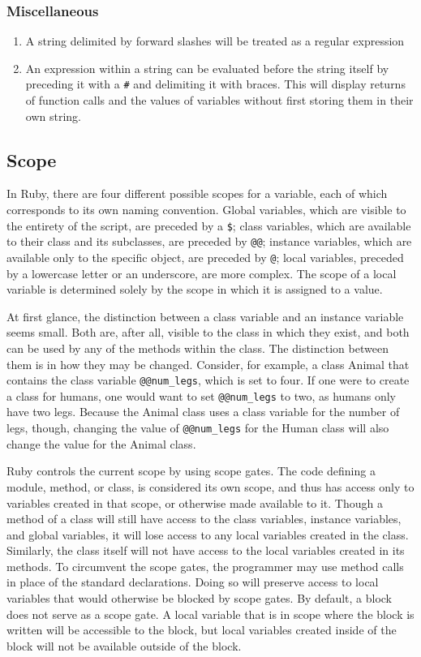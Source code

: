 \documentclass[12pt]{article}
\begin{document}
\subsubsection{Miscellaneous}
\begin{enumerate}
    \item{A string delimited by forward slashes will be treated as a regular expression}
    \item{An expression within a string can be evaluated before the string itself by preceding it with a \verb|#| and delimiting it with braces. This will display returns of function calls and the values of variables without first storing them in their own string.}
\end{enumerate}


\subsection{Scope}
In Ruby, there are four different possible scopes for a variable, each of which corresponds to its own naming convention. Global variables, which are visible to the entirety of the script, are preceded by a \verb|$|; class variables, which are available to their class and its subclasses, are preceded by \verb|@@|; instance variables, which are available only to the specific object, are preceded by \verb|@|; local variables, preceded by a lowercase letter or an underscore, are more complex. The scope of a local variable is determined solely by the scope in which it is assigned to a value\cite{darko}.

At first glance, the distinction between a class variable and an instance variable seems small. Both are, after all, visible to the class in which they exist, and both can be used by any of the methods within the class. The distinction between them is in how they may be changed. Consider, for example, a class Animal that contains the class variable \verb|@@num_legs|, which is set to four. If one were to create a class for humans, one would want to set \verb|@@num_legs| to two, as humans only have two legs. Because the Animal class uses a class variable for the number of legs, though, changing the value of \verb|@@num_legs| for the Human class will also change the value for the Animal class\cite{darko}.

Ruby controls the current scope by using scope gates. The code defining a module, method, or class, is considered its own scope, and thus has access only to variables created in that scope, or otherwise made available to it. Though a method of a class will still have access to the class variables, instance variables, and global variables, it will lose access to any local variables created in the class. Similarly, the class itself will not have access to the local variables created in its methods. To circumvent the scope gates, the programmer may use method calls in place of the standard declarations. Doing so will preserve access to local variables that would otherwise be blocked by scope gates. By default, a block does not serve as a scope gate. A local variable that is in scope where the block is written will be accessible to the block, but local variables created inside of the block will not be available outside of the block\cite{darko}. 
\end{document}
